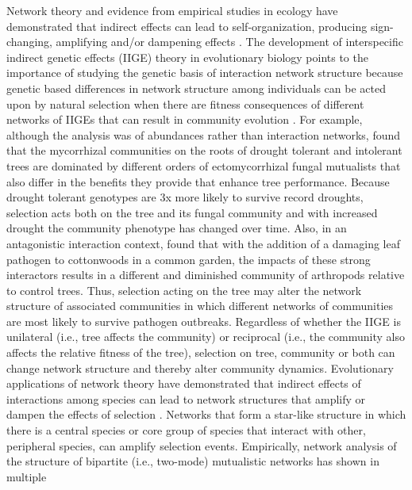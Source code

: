 \documentclass[11pt,twocolumn,twoside,lineno]{pnas-new}
\begin{document}
Network theory and evidence from empirical studies in ecology have
demonstrated that indirect effects can lead to self-organization,
producing sign-changing, amplifying and/or dampening effects
\cite{Newman2006, Sole2006Self-OrganizationEcosystems}. The
development of interspecific indirect genetic effects (IIGE) theory
\cite{Shuster2006COMMUNITYSTRUCTURE} in evolutionary biology points to
the importance of studying the genetic basis of interaction network
structure because genetic based differences in network structure among
individuals can be acted upon by natural selection when there are
fitness consequences of different networks of IIGEs that can result in
community evolution \cite{Whitham2020IntraspecificEvolution}. For
example, although the analysis was of abundances rather than
interaction networks, \citep{Gehring2014PlantChange, Gehring2017a}
found that the mycorrhizal communities on the roots of drought
tolerant and intolerant trees are dominated by different orders of
ectomycorrhizal fungal mutualists that also differ in the benefits
they provide that enhance tree performance. Because drought tolerant
genotypes are 3x more likely to survive record droughts, selection
acts both on the tree and its fungal community and with increased
drought the community phenotype has changed over time. Also, in an
antagonistic interaction context, \citep{Busby2015} found that with
the addition of a damaging leaf pathogen to cottonwoods in a common
garden, the impacts of these strong interactors results in a different
and diminished community of arthropods relative to control
trees. Thus, selection acting on the tree may alter the network
structure of associated communities in which different networks of
communities are most likely to survive pathogen outbreaks. Regardless
of whether the IIGE is unilateral (i.e., tree affects the community)
or reciprocal (i.e., the community also affects the relative fitness
of the tree), selection on tree, community or both can change network
structure \cite{Whitham2020IntraspecificEvolution} and thereby alter
community dynamics.  Evolutionary applications of network theory have
demonstrated that indirect effects of interactions among species can
lead to network structures that amplify or dampen the effects of
selection \cite{Lieberman2005EvolutionaryGraphs}. Networks that form a
star-like structure in which there is a central species or core group
of species that interact with other, peripheral species, can amplify
selection events. Empirically, network analysis of the structure of
bipartite (i.e., two-mode) mutualistic networks has shown in multiple
\end{document}
